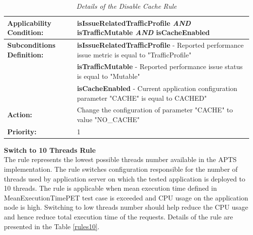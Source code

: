 \documentclass[12pt,a4paper]{article}
\begin{document}
\begin{table}[!htb]
\begin{center}
\begin{tabularx}{\textwidth}{l|X}

\textbf{Applicability Condition:} & \textbf{isIssueRelatedTrafficProfile} \textit{AND} \newline
\textbf{isTrafficMutable} \textit{AND} \newline
\textbf{isCacheEnabled} \\ \hline
\textbf{Subconditions Definition:} & \textbf{isIssueRelatedTrafficProfile} -  Reported performance issue metric is equal to "TrafficProfile"  \\
& \textbf{isTrafficMutable} - Reported performance issue status is equal to "Mutable" \\
& \textbf{isCacheEnabled} - Current application configuration parameter "CACHE" is equal to CACHED" \\ \hline

\textbf{Action:} & Change the configuration of parameter "CACHE" to value "NO\_CACHE" \\ \hline
\textbf{Priority:} & 1\\
\end{tabularx}
\end{center}
\caption{\textit{Details of the Disable Cache Rule}} \label{ruledisablecache}
\end{table}
\vspace{5mm}
\noindent\textbf{Switch to 10 Threads Rule} \\
The rule represents the lowest possible threads number available in the APTS implementation. The rule switches configuration responsible for the number of threads used by application server on which the tested application is deployed to 10 threads. The rule is applicable when mean execution time defined in MeanExecutionTimePET test case is exceeded and CPU usage on the application node is high.  Switching to low threads number should help reduce the CPU usage and hence reduce total execution time of the requests. Details of the rule are presented in the Table \ref{rules10}.
\end{document}
